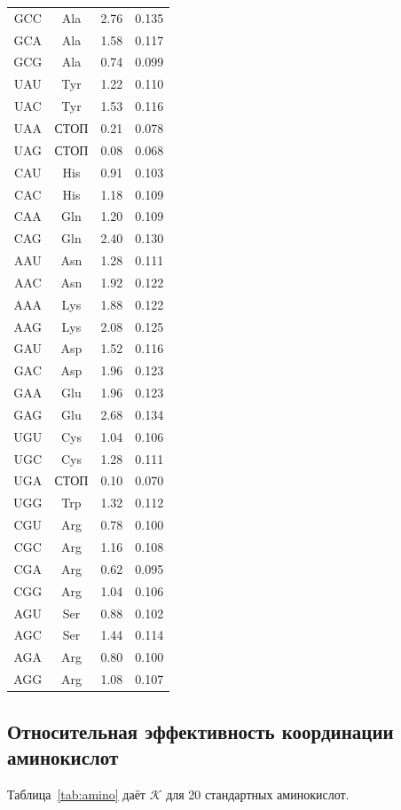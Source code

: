 \documentclass[12pt,a4paper]{article}
\newcommand{\REL}{\mathcal{K}}          %
\begin{document}
\begin{longtable}{|c|c|c|c|}
		GCC & Ala & 2.76 & 0.135 \\
		GCA & Ala & 1.58 & 0.117 \\
		GCG & Ala & 0.74 & 0.099 \\
		UAU & Tyr & 1.22 & 0.110 \\
		UAC & Tyr & 1.53 & 0.116 \\
		UAA & СТОП & 0.21 & 0.078 \\
		UAG & СТОП & 0.08 & 0.068 \\
		CAU & His & 0.91 & 0.103 \\
		CAC & His & 1.18 & 0.109 \\
		CAA & Gln & 1.20 & 0.109 \\
		CAG & Gln & 2.40 & 0.130 \\
		AAU & Asn & 1.28 & 0.111 \\
		AAC & Asn & 1.92 & 0.122 \\
		AAA & Lys & 1.88 & 0.122 \\
		AAG & Lys & 2.08 & 0.125 \\
		GAU & Asp & 1.52 & 0.116 \\
		GAC & Asp & 1.96 & 0.123 \\
		GAA & Glu & 1.96 & 0.123 \\
		GAG & Glu & 2.68 & 0.134 \\
		UGU & Cys & 1.04 & 0.106 \\
		UGC & Cys & 1.28 & 0.111 \\
		UGA & СТОП & 0.10 & 0.070 \\
		UGG & Trp & 1.32 & 0.112 \\
		CGU & Arg & 0.78 & 0.100 \\
		CGC & Arg & 1.16 & 0.108 \\
		CGA & Arg & 0.62 & 0.095 \\
		CGG & Arg & 1.04 & 0.106 \\
		AGU & Ser & 0.88 & 0.102 \\
		AGC & Ser & 1.44 & 0.114 \\
		AGA & Arg & 0.80 & 0.100 \\
		AGG & Arg & 1.08 & 0.107 \\
		\hline
	\end{longtable}
	
	\subsection{Относительная эффективность координации аминокислот}
	\label{sec:aminoacids}
	Таблица~\ref{tab:amino} даёт \(\REL\) для 20 стандартных аминокислот.
	
\end{document}

